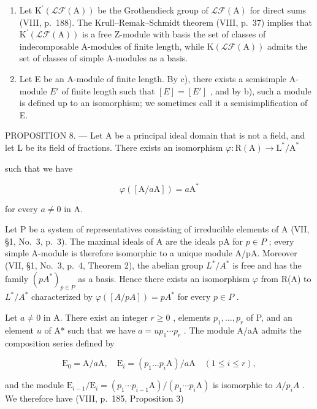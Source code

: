 \begin{enumerate}
\def\labelenumi{\arabic{enumi})}
\setcounter{enumi}{1}
\item
  Let \(\mathrm{K}^{\prime}(\mathcal{L}\mathcal{F}(\mathrm{A}))\) be the Grothendieck group of \(\mathcal{L}\mathcal{F}(\mathrm{A})\) for direct sums (VIII, p.~188). The Krull--Remak--Schmidt theorem (VIII, p.~37) implies that \(\mathrm{K}^{\prime}(\mathcal{L}\mathcal{F}(\mathrm{A}))\) is a free Z-module with basis the set of classes of indecomposable A-modules of finite length, while \(\mathrm{K}(\mathcal{L}\mathcal{F}(\mathrm{A}))\) admits the set of classes of simple A-modules as a basis.
\item
  Let E be an A-module of finite length. By c), there exists a semisimple A-module \(E'\) of finite length such that \([E] = [E']\) , and by b), such a module is defined up to an isomorphism; we sometimes call it a semisimplification of E.
\end{enumerate}

PROPOSITION 8. --- Let A be a principal ideal domain that is not a field, and let L be its field of fractions. There exists an isomorphism \(\varphi : \mathrm{R}(\mathrm{A}) \to \mathrm{L}^{*}/\mathrm{A}^{*}\)

such that we have

\[
\varphi ([ \mathrm{A} / a \mathrm{A} ]) = a \mathrm{A} ^ {*}\tag{9}
\]

for every \(a \neq 0\) in A.

Let P be a system of representatives consisting of irreducible elements of A (VII, §1, No.~3, p.~3). The maximal ideals of A are the ideals pA for \(p \in P\) ; every simple A-module is therefore isomorphic to a unique module A/pA. Moreover (VII, §1, No.~3, p.~4, Theorem 2), the abelian group \(L^{*}/A^{*}\) is free and has the family \((pA^{*})_{p \in P}\) as a basis. Hence there exists an isomorphism \(\varphi\) from R(A) to \(L^{*}/A^{*}\) characterized by \(\varphi([A/pA]) = pA^{*}\) for every \(p \in P\) .

Let \(a \neq 0\) in A. There exist an integer \(r \geqslant 0\) , elements \(p_1, \ldots, p_r\) of P, and an element \(u\) of A* such that we have \(a = up_1 \cdots p_r\) . The module A/aA admits the composition series defined by

\[
\mathrm{E} _ {0} = \mathrm{A} / a \mathrm{A}, \quad \mathrm{E} _ {i} = (p _ {1} \dots p _ {i} \mathrm{A}) / a \mathrm{A} \quad (1 \leqslant i \leqslant r),
\]

and the module \(\mathrm{E}_{i-1}/\mathrm{E}_{i}=(p_{1}\cdots p_{i-1}\mathrm{A})/(p_{1}\cdots p_{i}\mathrm{A})\) is isomorphic to \(A/p_{i}A\) . We therefore have (VIII, p.~185, Proposition 3)

